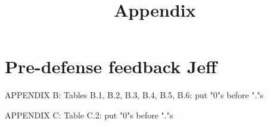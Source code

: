 \documentclass[12pt]{article}
\title{Appendix}
\date{}
\begin{document}
\maketitle

\section*{Pre-defense feedback Jeff}
	\begin{coi}
		\item APPENDIX B: Tables B.1, B.2, B.3, B.4, B.5, B.6: put "0"s before "."s
		\item APPENDIX C: Table C.2: put "0"s before "."s
	\end{coi}
\end{document}
